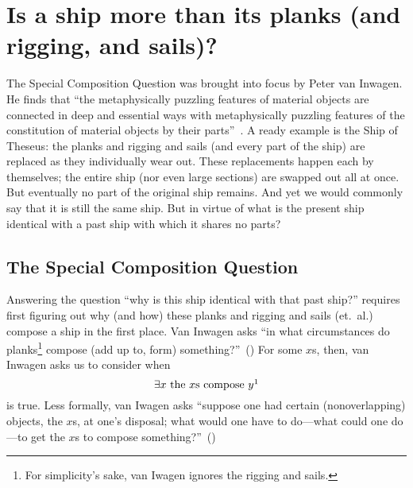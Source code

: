 \section{Is a ship more than its planks (and rigging, and sails)?}
The Special Composition Question was brought into focus by Peter van Inwagen. He finds that ``the metaphysically puzzling features of material objects are connected in deep and essential ways with metaphysically puzzling features of the constitution of material objects by their parts''~\citep[18]{inwagen1995}. A ready example is the Ship of Theseus: the planks and rigging and sails (and every part of the ship) are replaced as they individually wear out. These replacements happen each by themselves; the entire ship (nor even large sections) are swapped out all at once. But eventually no part of the original ship remains. And yet we would commonly say that it is still the same ship. But in virtue of what is the present ship identical with a past ship with which it shares no parts?

\subsection{The Special Composition Question}
Answering the question ``why is this ship identical with that past ship?'' requires first figuring out why (and how) these planks and rigging and sails (et.\ al.) compose a ship in the first place. Van Inwagen asks ``in what circumstances do planks\footnote{For simplicity's sake, van Iwagen ignores the rigging and sails.} compose (add up to, form) something?''~(\citeyear[21]{inwagen1995}) For some $x$s, then, van Inwagen asks us to consider when
\begin{equation}
\exists x\ \text{the}\ x\text{s compose}\ y \footnotemark
\end{equation}%
%
%
is true. Less formally, van Iwagen asks ``suppose one had certain (nonoverlapping) objects, the $x$s, at one's disposal; what would one have to do---what could one do---to get the $x$s to compose something?''~(\citeyear[31]{inwagen1995})


